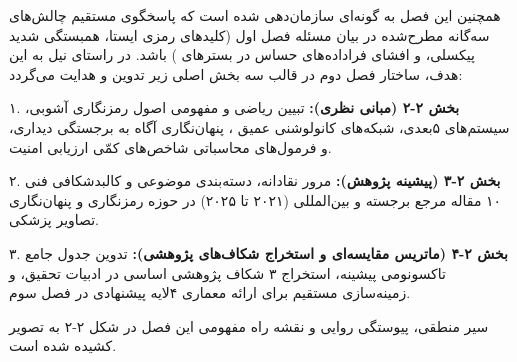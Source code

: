 

همچنین این فصل به گونه‌ای سازمان‌دهی شده است که پاسخگوی مستقیم چالش‌های سه‌گانه مطرح‌شده در بیان مسئله فصل اول (کلیدهای رمزی ایستا، همبستگی شدید پیکسلی، و افشای فراداده‌های حساس در بسترهای ) باشد. در راستای نیل به این هدف، ساختار فصل دوم در قالب سه بخش اصلی زیر تدوین و هدایت می‌گردد:\par



۱. \textbf{بخش ۲{-}۲ (مبانی نظری):} تبیین ریاضی و مفهومی اصول رمزنگاری آشوبی، سیستم‌های ۵بعدی، شبکه‌های کانولوشنی عمیق ، پنهان‌نگاری آگاه به برجستگی دیداری، و فرمول‌های محاسباتی شاخص‌های کمّی ارزیابی امنیت.\par

۲. \textbf{بخش ۲{-}۳ (پیشینه پژوهش):} مرور نقادانه، دسته‌بندی موضوعی و کالبدشکافی فنی ۱۰ مقاله مرجع برجسته و بین‌المللی (۲۰۲۱ تا ۲۰۲۵) در حوزه رمزنگاری و پنهان‌نگاری تصاویر پزشکی.\par

۳. \textbf{بخش ۲{-}۴ (ماتریس مقایسه‌ای و استخراج شکاف‌های پژوهشی):} تدوین جدول جامع تاکسونومی پیشینه، استخراج ۳ شکاف پژوهشی اساسی در ادبیات تحقیق، و زمینه‌سازی مستقیم برای ارائه معماری ۴لایه پیشنهادی در فصل سوم.\par



سیر منطقی، پیوستگی روایی  و نقشه راه مفهومی این فصل در شکل ۲{-}۲ به تصویر کشیده شده است.\par






